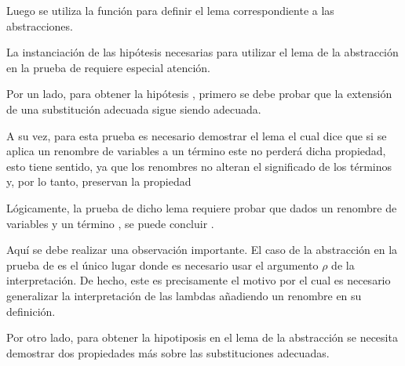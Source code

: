 
Luego se utiliza la función  para definir el lema correspondiente a las abstracciones.


La instanciación de las hipótesis necesarias para utilizar el lema de la abstracción en la prueba de  requiere especial atención.

Por un lado, para obtener la hipótesis \snstar {}, primero se debe probar que la extensión de una substitución adecuada sigue siendo adecuada.


A su vez, para esta prueba es necesario demostrar el lema  el cual dice que si se aplica un renombre de variables a un término \snstar este no perderá dicha propiedad, esto tiene sentido, ya que los renombres no alteran el significado de los términos y, por lo tanto, preservan la propiedad \snstar


Lógicamente, la prueba de dicho lema requiere probar que dados un renombre de variables \bound{$\rho$} y un término , se puede concluir .


Aquí se debe realizar una observación importante.
El caso de la abstracción en la prueba de  es el único lugar donde es necesario usar el argumento $\rho$ de la interpretación.
De hecho, este es precisamente el motivo por el cual es necesario generalizar la interpretación de las lambdas añadiendo un renombre en su definición.

\iffalse
En segundo lugar, en la prueba de \func{SN*-rename} se debe eliminar el renombre del paso de reducción para poder utilizar la hipótesis \bound{SNt}.
Para ello se define el siguiente lema:

\ExecuteMetaData[code/strong_norm_base.tex]{rename-reduction-type}

Básicamente, el lema dice que si una reducción parte de un término renombrado $t_\rho$, el resultado será un término $t'_\rho$, donde $t'$ se obtiene dando un paso de reducción desde $t$.
\fi

Por otro lado, para obtener la hipotiposis  en el lema de la abstracción se necesita demostrar dos propiedades más sobre las substituciones adecuadas.


